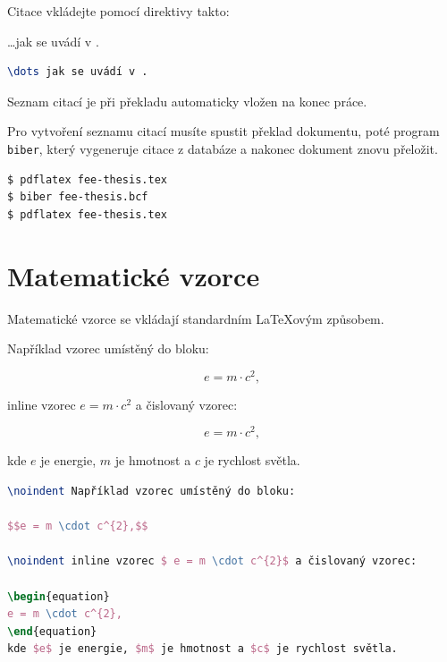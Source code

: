 Citace vkládejte pomocí direktivy  takto:

\dots jak se uvádí v .

\begin{lstlisting}[caption={Příklad vložení citace},label=list:8-6,captionpos=t,abovecaptionskip=-\medskipamount,belowcaptionskip=\medskipamount,language=TeX]
\dots jak se uvádí v .
\end{lstlisting}

\begin{note}
Seznam citací je při překladu automaticky vložen na konec práce.

Pro vytvoření seznamu citací musíte spustit překlad dokumentu, poté program \texttt{biber}, který vygeneruje citace z databáze a nakonec dokument znovu přeložit.
\end{note}


\begin{lstlisting}[caption={Příklad překladu pro vygenerování seznamu citací},label=list:8-6,captionpos=t,abovecaptionskip=-\medskipamount,belowcaptionskip=\medskipamount,language=bash]
$ pdflatex fee-thesis.tex
$ biber fee-thesis.bcf
$ pdflatex fee-thesis.tex
\end{lstlisting}

\clearpage


\section{Matematické vzorce}

Matematické vzorce se vkládají standardním \LaTeX{}ovým způsobem.

\noindent Například vzorec umístěný do bloku:

$$e = m \cdot c^{2},$$

\noindent inline vzorec $ e = m \cdot c^{2}$ a čislovaný vzorec:

\begin{equation}
e = m \cdot c^{2},
\end{equation}

kde $e$ je energie, $m$ je hmotnost a $c$ je rychlost světla.

\begin{lstlisting}[caption={Příklad vložení matemetických vzorců},label=list:8-6,captionpos=t,abovecaptionskip=-\medskipamount,belowcaptionskip=\medskipamount,language=TeX]
\noindent Například vzorec umístěný do bloku:

$$e = m \cdot c^{2},$$

\noindent inline vzorec $ e = m \cdot c^{2}$ a čislovaný vzorec:

\begin{equation}
e = m \cdot c^{2},
\end{equation}
kde $e$ je energie, $m$ je hmotnost a $c$ je rychlost světla.
\end{lstlisting}

